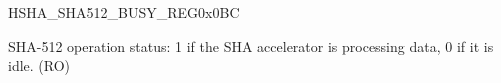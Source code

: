 \begin{register}{H}{SHA\_SHA512\_BUSY\_REG}{0x0BC}\label{regdesc:SHASHA512BUSYREG}
%
%
\regnewline%
\begin{regdesc}\begin{reglist}
\item [SHA\_SHA512\_BUSY]SHA-512 operation status: 1 if the SHA accelerator is processing data, 0 if it is idle. (RO)
\end{reglist}\end{regdesc}
\end{register}

